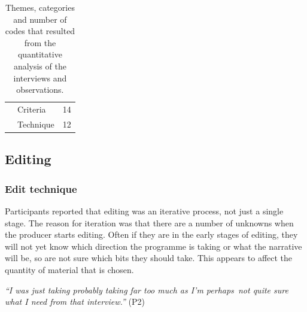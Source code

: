 \begin{table}[h]
{\begin{tabular}{|l|l|l|}
      & Criteria & 14 \\ \cline{2-3} %
      & Technique & 12 \\ \hline %

    \end{tabular}
  }
  \caption{Themes, categories and number of codes that resulted from the quantitative analysis of the interviews and
  observations.}
  \label{tab:paper-codes}
\end{table}

\subsection{Editing}

\subsubsection{Edit technique}


Participants reported that editing was an iterative process, not just a single stage.
The reason for iteration was that there are a number of unknowns when the producer starts editing.
Often if they are in the early stages of editing, they will not yet know which direction the programme is taking or
what the narrative will be, so are not sure which bits they should take.  This appears to affect the quantity of
material that is chosen.

\textit{``I was just taking probably taking far too much as I'm perhaps not quite sure what I need from that
interview.''} (P2)



